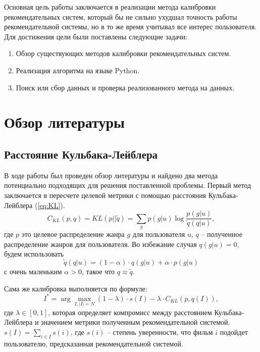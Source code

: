 \documentclass[a4paper,article,14pt]{extarticle}
\begin{document}

Основная цель работы заключается в реализации метода калибровки рекомендательных систем, который бы не сильно ухудшал точность работы рекомендательной системы, но в то же время учитывал все интерес пользователя.
\\

Для достижения цели были поставлены следующие задачи:
\begin{enumerate} 
    \item Обзор существующих методов калибровки рекомендательных систем.
    \item Реализация алгоритма на языке Python.
    \item Поиск или сбор данных и проверка реализованного метода на данных.
  \end{enumerate}
  
\pagebreak
\section{Обзор литературы}
\subsection{Расстояние Кульбака-Лейблера}
В ходе работы был проведен обзор литературы и найдено два метода потенциально подходящих для решения поставленной проблемы. Первый метод заключается в пересчете целевой метрики с помощью расстояния Кульбака-Лейблера (\ref{eq:KL}). \cite{voc1}
\begin{equation}
  C_{KL}(p,q) = KL(p||\tilde{q}) = \sum_g p(g|u)\log\frac{p(g|u)}{\tilde{q}(q|u)},
  \label{eq:KL}
\end{equation}
где ${p}$ это целевое распределение жанра ${g}$ для пользователя $u$, $q$ -- полученное распределение жанров для пользователя.
Во избежание случая $q(g|u)=0$, будем использовать 
\begin{equation}
  \tilde{q}(q|u) = (1-\alpha) \cdot q(g|u) + \alpha \cdot p(g|u)
\end{equation} с очень маленьким $\alpha>0$, такое что $q\approx\tilde{q}$.

Сама же калибровка выполняется по формуле: 
\begin{equation}
  \label{eq:Calibrated}
  I^*=\arg \max_{I, |I|=N} (1-\lambda) \cdot s(I) - \lambda \cdot C_{KL}(p,q(I)),
\end{equation} где $\lambda \in [0,1]$, которая определяет компромисс между расстоянием Кульбака-Лейблера и значением метрики полученным рекомендательной системой. $s(I)=\sum_{i\in I}s(i)$, где $s(i)$ -- степень уверенности, что фильм $i$ подойдет пользователю, предсказанная рекомендательной системой.
\end{document}
